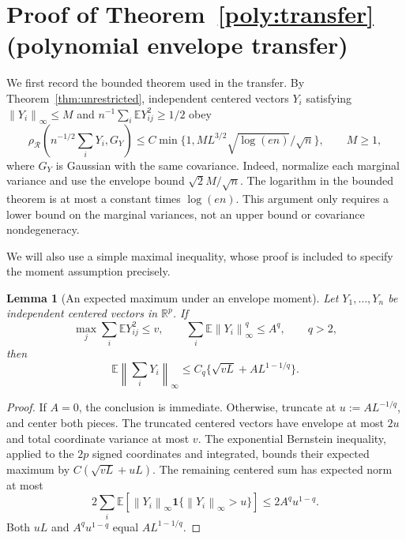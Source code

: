 \documentclass[11pt,letterpaper]{article}
\newtheorem{lemma}{Lemma}
\theoremstyle{remark}
\newcommand{\E}{\mathbb E}
\newcommand{\R}{\mathbb R}
\newcommand{\norm}[1]{\left\lVert#1\right\rVert}
\newcommand{\rh}{\rho_{\mathcal R}}
\newcommand{\ind}{\mathbf 1}
\begin{document}
\section{Proof of Theorem~\ref*{poly:transfer} (polynomial envelope transfer)}\label{app:conditional}

We first record the bounded theorem used in the transfer. By Theorem~\ref{thm:unrestricted}, independent
centered vectors \(Y_i\) satisfying \(\norm{Y_i}_\infty\le M\)
and \(n^{-1}\sum_i\E Y_{ij}^2\ge1/2\) obey
\begin{equation}
 \rh\left(n^{-1/2}\sum_iY_i,G_Y\right)
 \le C\min\{1,ML^{3/2}\sqrt{\log(en)}/\sqrt n\},\qquad M\ge1,
 \label{app:bounded-input}
\end{equation}
where \(G_Y\) is Gaussian with the same covariance. Indeed, normalize
each marginal variance and use the envelope bound \(\sqrt2 M/\sqrt n\).
The logarithm in the bounded theorem is at most a constant times
\(\log(en)\). This argument only requires a lower bound on the marginal
variances, not an upper bound or covariance nondegeneracy.

We will also use a simple maximal inequality, whose proof is included
to specify the moment assumption precisely.

\begin{lemma}[An expected maximum under an envelope moment]\label{lem:maximum}
Let \(Y_1,\ldots,Y_n\) be independent centered vectors in \(\R^p\).
If
\[
 \max_j\sum_i\E Y_{ij}^2\le v,\qquad
 \sum_i\E\norm{Y_i}_\infty^q\le A^q,\qquad q>2,
\]
then
\begin{equation}
 \E\norm{\sum_iY_i}_\infty
 \le C_q\{\sqrt{vL}+AL^{1-1/q}\}.
 \label{app:maximal}
\end{equation}
\end{lemma}
\begin{proof}
If \(A=0\), the conclusion is immediate. Otherwise, truncate at
\(u:=AL^{-1/q}\), and center both pieces. The truncated centered
vectors have envelope at most \(2u\) and total coordinate variance at
most \(v\). The exponential Bernstein inequality, applied to the
\(2p\) signed coordinates and integrated, bounds their expected maximum
by \(C(\sqrt{vL}+uL)\). The remaining centered sum has expected norm
at most
\[
 2\sum_i\E[\norm{Y_i}_\infty\ind\{\norm{Y_i}_\infty>u\}]
 \le2A^qu^{1-q}.
\]
Both \(uL\) and \(A^qu^{1-q}\) equal \(AL^{1-1/q}\).
\end{proof}
\end{document}
